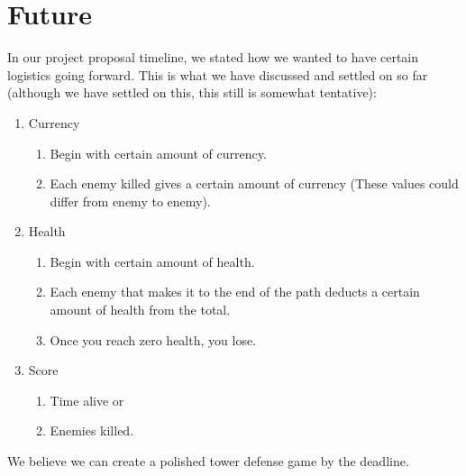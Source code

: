 \documentclass[12pt, twoside]{article}
\begin{document}
\section*{Future}
In our project proposal timeline, we stated how we wanted to have certain logistics going forward. This is what we have discussed and settled on so far (although we have settled on this, this still is somewhat tentative):

\begin{enumerate}
    \item Currency
        \begin{enumerate}
            \item Begin with certain amount of currency.
            \item Each enemy killed gives a certain amount of currency (These values could differ from enemy to enemy).
        \end{enumerate}
    \item Health
        \begin{enumerate}
            \item Begin with certain amount of health.
            \item Each enemy that makes it to the end of the path deducts a certain amount of health from the total.
            \item Once you reach zero health, you lose.
        \end{enumerate}
    \item Score
        \begin{enumerate}
            \item Time alive or
            \item Enemies killed.
        \end{enumerate}
\end{enumerate}

\noindent
We believe we can create a polished tower defense game by the deadline.

 
 
\end{document}
